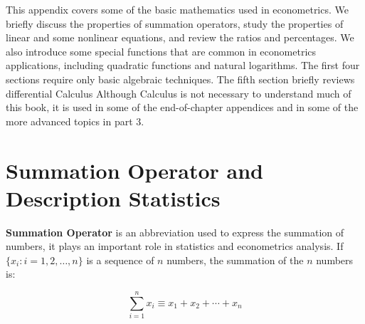 \documentclass[12pt]{elegantbook}
\begin{document}
This appendix covers some of the basic mathematics used in econometrics. We briefly discuss the properties of summation operators, study the properties of linear and some nonlinear equations, and review the ratios and percentages. We also introduce some special functions that are common in econometrics applications, including quadratic functions and natural logarithms. The first four sections require only basic algebraic techniques. The fifth section briefly reviews differential Calculus Although Calculus is not necessary to understand much of this book, it is used in some of the end-of-chapter appendices and in some of the more advanced topics in part 3.

\section{Summation Operator and Description Statistics}

\textbf{Summation Operator} is an abbreviation used to express the summation of numbers, it plays an important role in statistics and econometrics analysis. If $\{x_i: i=1, 2, \ldots, n\}$ is a sequence of $n$ numbers, the summation of the $n$ numbers is:

\begin{equation}
\sum_{i=1}^n x_i \equiv x_1 + x_2 +\cdots + x_n
\end{equation}
\end{document}
